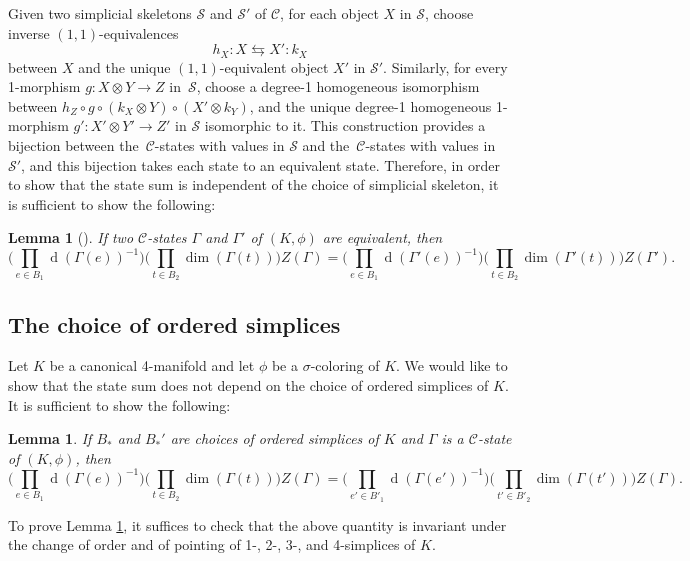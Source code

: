 \documentclass[a4paper, oneside]{amsart}
\DeclareMathOperator{\wdim}{d}
\numberwithin{equation}{subsection}
\theoremstyle{referencedlemma}
\newtheorem{lemref}[equation]{Lemma}
\theoremstyle{plain} %
\newtheorem{lem}[equation]{Lemma}
\theoremstyle{remark}
\begin{document}
Given two simplicial skeletons $\mathcal{S}$ and $\mathcal{S}'$ of $\mathcal{C}$, for each object $X$ in $\mathcal{S}$, choose inverse $(1,1)$-equivalences
$$
h_X \colon X \leftrightarrows X'\colon k_X
$$
between $X$ and the unique $(1,1)$-equivalent object $X'$ in $\mathcal{S}'$. Similarly, for every 1-morphism $g\colon X\otimes Y \to Z$ in~$\mathcal{S}$, choose a degree-1 homogeneous isomorphism between $h_Z \circ g \circ (k_X\otimes Y) \circ (X'\otimes k_Y)$, and the unique \mbox{degree-1} homogeneous 1-morphism $g'\colon X'\otimes Y' \to Z'$ in $\mathcal{S}$ isomorphic to it.  This construction provides a bijection between the~$\mathcal{C}$-states with values in $\mathcal{S}$ and the~$\mathcal{C}$-states with values in $\mathcal{S}'$, and this bijection takes each state to an equivalent state.  Therefore,  in order to show that the state sum is independent of the choice of simplicial skeleton, it is sufficient to show the following:

\begin{lemref}[\cite{douglas_fusion_2018}]
If two $\mathcal{C}$-states $\Gamma$ and $\Gamma'$ of $(K,\phi)$ are equivalent, then
$$
\Big(\prod_{e\in B_1} \wdim (\Gamma(e))^{-1}\Big) \Big( \prod_{t\in B_2}\dim (\Gamma(t))\Big) Z(\Gamma) = \Big(\prod_{e\in B_1} \wdim (\Gamma'(e))^{-1}\Big) \Big(\prod_{t\in B_2}\dim (\Gamma'(t))\Big) Z(\Gamma'). 
$$
\end{lemref}

\subsection{The choice of ordered simplices}\label{Invariance ordered simplices}

Let $K$ be a canonical 4-manifold and let $\phi$ be a $\sigma$-coloring of $K$.  We would like to show that the state sum does not depend on the choice of ordered simplices of $K$.  It is sufficient to show the following:

\begin{lem}\label{Lemma choice of ordered simplices}
If $B_*$ and $B_*'$ are choices of ordered simplices of $K$ and $\Gamma$ is a $\mathcal{C}$-state of $(K,\phi)$, then
$$
\Big(\prod_{e\in B_1} \wdim (\Gamma(e))^{-1}\Big) \Big( \prod_{t\in B_2}\dim (\Gamma(t))\Big) Z(\Gamma) = \Big(\prod_{e'\in B'_1} \wdim (\Gamma(e'))^{-1}\Big) \Big(\prod_{t'\in B'_2}\dim (\Gamma(t'))\Big) Z(\Gamma). 
$$
\end{lem}
To prove Lemma \ref{Lemma choice of ordered simplices}, it suffices to check that the above quantity is invariant under the change of order and of pointing of 1-, 2-, 3-, and 4-simplices of $K$.  
\end{document}
